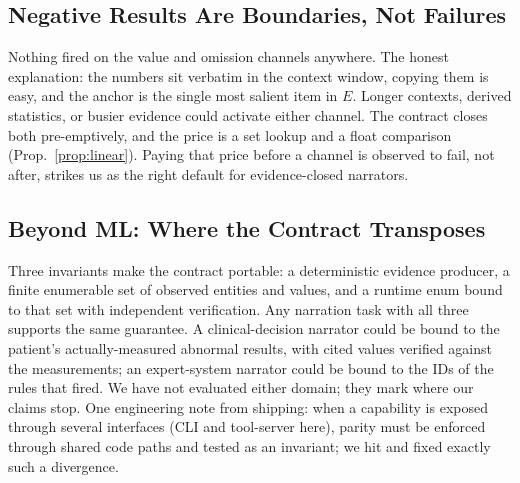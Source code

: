 \documentclass[conference]{IEEEtran}
\begin{document}
\subsection{Negative Results Are Boundaries, Not Failures}
\label{sec:negative}
Nothing fired on the value and omission channels anywhere. The honest explanation: the numbers sit verbatim in the context window, copying them is easy, and the anchor is the single most salient item in $E$. Longer contexts, derived statistics, or busier evidence could activate either channel. The contract closes both pre-emptively, and the price is a set lookup and a float comparison (Prop.~\ref{prop:linear}). Paying that price before a channel is observed to fail, not after, strikes us as the right default for evidence-closed narrators.

\subsection{Beyond ML: Where the Contract Transposes}
Three invariants make the contract portable: a deterministic evidence producer, a finite enumerable set of observed entities and values, and a runtime enum bound to that set with independent verification. Any narration task with all three supports the same guarantee. A clinical-decision narrator could be bound to the patient's actually-measured abnormal results, with cited values verified against the measurements; an expert-system narrator could be bound to the IDs of the rules that fired. We have not evaluated either domain; they mark where our claims stop. One engineering note from shipping: when a capability is exposed through several interfaces (CLI and tool-server here), parity must be enforced through shared code paths and tested as an invariant; we hit and fixed exactly such a divergence.
\end{document}
